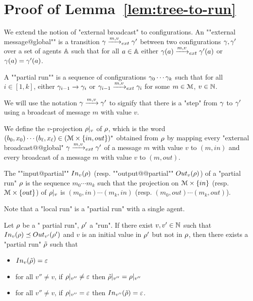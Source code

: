 \section{Proof of Lemma~\ref{lem:tree-to-run}}

\begin{definition}
	We extend the notion of "external broadcast" to configurations.
	An ""external message@global"" is a transition $\gamma \xrightarrow{m, v}_{ext} \gamma'$ between two configurations $\gamma, \gamma'$ over a set of agents $\mathbb{A}$ such that for all $a \in \mathbb{A}$ either $\gamma(a) \xrightarrow{m, v}_{ext} \gamma'(a)$ or $\gamma(a) = \gamma'(a)$.
	
	A ""partial run"" is a sequence of configurations $\gamma_0 \cdots \gamma_k$  such that for all $i \in [1, k]$, either $\gamma_{i-1} \xrightarrow{} \gamma_{i}$ or $\gamma_{i-1} \xrightarrow{m, v}_{ext} \gamma_{i}$ for some $m \in \mathcal{M}$, $v\in \mathbb{N}$. 
	
	We will use the notation $\gamma \xrightarrow{m, v} \gamma'$ to signify that there is a "step" from $\gamma$ to $\gamma'$ using a broadcast of message $m$ with value $v$.
	
	We define the $v$-projection ${\rho}|_{v}$ of $\rho$, which is the word $(b_0, x_0) \cdots (b_\ell, x_\ell) \in (\mathcal{M} \times \{in, out\})^*$ obtained from $\rho$ by mapping every "external broadcast@@global" $\gamma \xrightarrow{m, v}_{ext} \gamma'$ of a message $m$ with value $v$ to $(m, in)$ and every broadcast of a message $m$ with value $v$ to $(m, out)$.
	
	The ""input@partial"" $\vinput{v}{\run}$ (resp. ""output@@partial"" $\voutput{v}{\run}$) of a "partial run" $\rho$ is the sequence $m_0 \cdots m_k$ such that the projection on $\mathcal{M} \times \{in\}$ (resp. $\mathcal{M}\times \{out\}$) of ${\rho}|_{v}$ is $(m_0, in) \cdots (m_k, in)$ (resp. $(m_0, out)\cdots(m_k, out)$).
	
	Note that a "local run" is a "partial run" with a single agent.
	
\end{definition}


\begin{lemma}
	Let $\rho$ be a " partial run", $\rho'$ a "run".
	If there exist $v, v' \in \mathbb{N}$ such that $\vinput{v}{\run} \subword \voutput{v'}{\run'}$ and $v$ is an initial value in $\rho'$ but not in $\rho$, then there exists a "partial run" $\Tilde{\rho}$ such that 
	\begin{itemize}
		\item $\vinput{v}{\Tilde{\run}} = \varepsilon$ 
		
		\item for all $v'' \neq v$, if ${\rho}|_{v''} \neq \varepsilon$ then ${\Tilde{\rho}}|_{v''} = {\rho}|_{v''}$
		
		\item for all $v'' \neq v$, if ${\rho}|_{v''} = \varepsilon$ then $\vinput{v''}{\Tilde{\run}} = \varepsilon$.
	\end{itemize}
\end{lemma}

